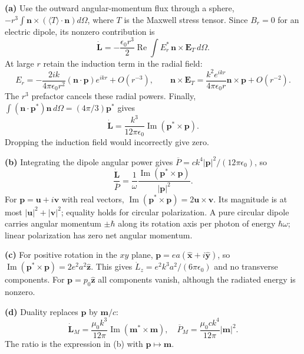\textbf{(a)} Use the outward angular-momentum flux through a sphere,
$-r^3\int\mathbf n\times(\langle T\rangle\cdot\mathbf n)d\Omega$,
where $T$ is the Maxwell stress tensor. Since $B_r=0$ for an electric
dipole, its nonzero contribution is
\[
\dot{\mathbf L}=-\frac{\epsilon_0r^3}{2}
\operatorname{Re}\int E_r^*\,\mathbf n\times\mathbf E_T\,d\Omega.
\]
At large $r$ retain the induction term in the radial field:
\[
E_r=-\frac{2ik}{4\pi\epsilon_0r^2}(
\mathbf n\cdot\mathbf p)e^{ikr}+O(r^{-3}),\qquad
\mathbf n\times\mathbf E_T=
\frac{k^2e^{ikr}}{4\pi\epsilon_0r}\mathbf n\times\mathbf p+O(r^{-2}).
\]
The $r^3$ prefactor cancels these radial powers. Finally,
$\int(\mathbf n\cdot\mathbf p^*)\mathbf n\,d\Omega=(4\pi/3)\mathbf p^*$
gives
\[
\boxed{\dot{\mathbf L}=\frac{k^3}{12\pi\epsilon_0}
\operatorname{Im}(\mathbf p^*\times\mathbf p).}
\]
Dropping the induction field would incorrectly give zero.

\textbf{(b)} Integrating the dipole angular power gives
$\overline P=ck^4|\mathbf p|^2/(12\pi\epsilon_0)$, so
\[
\boxed{\frac{\dot{\mathbf L}}{\overline P}
=\frac1\omega\frac{\operatorname{Im}(\mathbf p^*\times\mathbf p)}{|\mathbf p|^2}.}
\]
For $\mathbf p=\mathbf u+i\mathbf v$ with real vectors,
$\operatorname{Im}(\mathbf p^*\times\mathbf p)=2\mathbf u\times\mathbf v$.
Its magnitude is at most $|\mathbf u|^2+|\mathbf v|^2$; equality holds
for circular polarization. A pure circular dipole carries angular
momentum $\pm\hbar$ along its rotation axis per photon of energy
$\hbar\omega$; linear polarization has zero net angular momentum.

\textbf{(c)} For positive rotation in the $xy$ plane,
$\mathbf p=ea(\hat{\mathbf x}+i\hat{\mathbf y})$, so
$\operatorname{Im}(\mathbf p^*\times\mathbf p)=2e^2a^2\hat{\mathbf z}$.
This gives $\dot L_z=e^2k^3a^2/(6\pi\epsilon_0)$ and no transverse
components. For $\mathbf p=p_0\hat{\mathbf z}$ all components vanish,
although the radiated energy is nonzero.

\textbf{(d)} Duality replaces $\mathbf p$ by $\mathbf m/c$:
\[
\boxed{\dot{\mathbf L}_M=\frac{\mu_0k^3}{12\pi}
\operatorname{Im}(\mathbf m^*\times\mathbf m),\quad
\overline P_M=\frac{\mu_0ck^4}{12\pi}|\mathbf m|^2.}
\]
The ratio is the expression in (b) with $\mathbf p\mapsto\mathbf m$.

